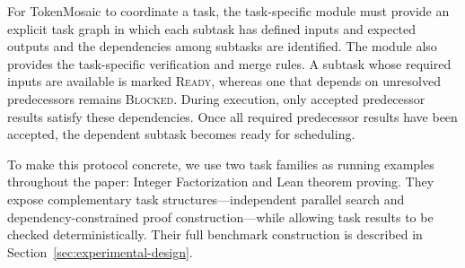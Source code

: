 \documentclass{article}
\theoremstyle{plain}
\begin{document}
For TokenMosaic to coordinate a task, the task-specific module must provide an explicit task graph in which each subtask has defined inputs and expected outputs and the dependencies among subtasks are identified. The module also provides the task-specific verification and merge rules. A subtask whose required inputs are available is marked \textsc{Ready}, whereas one that depends on unresolved predecessors remains \textsc{Blocked}. During execution, only accepted predecessor results satisfy these dependencies. Once all required predecessor results have been accepted, the dependent subtask becomes ready for scheduling.

To make this protocol concrete, we use two task families as running examples throughout the paper: Integer Factorization and Lean theorem proving. They expose complementary task structures---independent parallel search and dependency-constrained proof construction---while allowing task results to be checked deterministically. Their full benchmark construction is described in Section~\ref{sec:experimental-design}.
\end{document}
